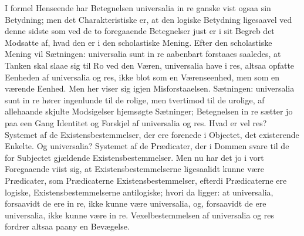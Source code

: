 \documentclass[12pt]{book}
\begin{document}
I formel Henseende har Betegnelsen universalia in re ganske vist ogsaa sin Betydning; men det
Charakteristiske er, at den logiske Betydning ligesaavel ved denne sidste som ved de to foregaaende
Betegnelser just er i sit Begreb det Modsatte af, hvad den er i den scholastiske Mening. Efter den
scholastiske Mening vil Sætningen: universalia sunt in re aabenbart forstaaes saaledes, at Tanken
skal slaae sig til Ro ved den Væren, universalia have i res, altsaa opfatte Eenheden af universalia
og res, ikke blot som en Værenseenhed, men som en værende Eenhed. Men her viser sig igjen
Misforstaaelsen. Sætningen: universalia sunt in re hører ingenlunde til de rolige, men tvertimod til
de urolige, af allehaande skjulte Modsigelser hjemsøgte Sætninger; Betegnelsen in re sætter jo paa
een Gang Identitet og Forskjel af universalia og res. Hvad er vel res? Systemet af de
Existensbestemmelser, der ere forenede i Objectet, det existerende Enkelte. Og universalia? Systemet
af de Prædicater, der i Dommen svare til de for Subjectet gjældende Existensbestemmelser. Men nu har
det jo i vort Foregaaende viist sig, at Existensbestemmelserne ligesaalidt kunne være Prædicater,
som Prædicaterne Existensbestemmelser, efterdi Prædicaterne ere logiske, Existensbestemmelserne
antilogiske; hvori da ligger: at universalia, forsaavidt de ere in re, ikke kunne være universalia,
og, forsaavidt de ere universalia, ikke kunne være in re. Vexelbestemmelsen af universalia og res
fordrer altsaa paany en Bevægelse.
\end{document}
